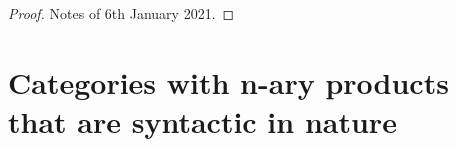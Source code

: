 \documentclass[10pt,a4paper]{scrartcl}
\begin{document}
\begin{proof}
Notes of 6th January 2021.
\end{proof}
\iffalse
\begin{lemma}
\llabel{permutationuniquenesslemma}
If $\sim_A$ and $\sim_B$ are each equivalence relations on the set $\set{\n}$ 
with similarity index functions $s_{\sim_A}: \set{\n} \morph \set{\n}$
and $s_{\sim_B}: \set{\n} \morph \set{\n}$, respectively,  if
$\sigma: \set{\n} \morph \set{\n}$ and $\sigma': \set{\n} \morph \set{\n}$ are permutations 
such that
\begin{align}
&i \sim_A j \mbox{ implies } \sigma(i) \sim_B \sigma(j) \\
&i \sim_B j \mbox{ implies } \sigma'^-1(i) \sim_A \sigma'^{-1}(j) \\
&s_{\sim_B}(\sigma(i))=s_{\sim_A}(i) \\
&s_{\sim_A}(\sigma'^{-1}(i))=s_{\sim_B}(i) 
\end{align}
then $\sigma=\sigma'$.
\end{lemma}
\fi

\section{Categories with n-ary products that are syntactic in nature}
\end{document}
